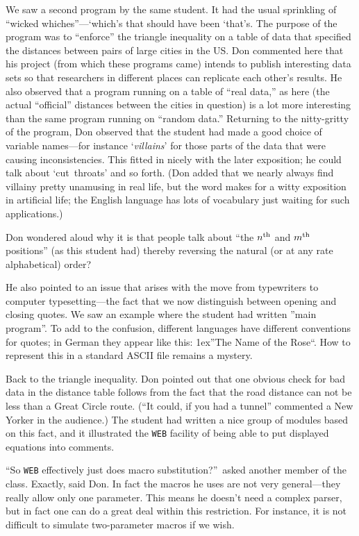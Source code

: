 We saw a second program by the same student. It had the usual
sprinkling of ``wicked whiches''---`which's that should have been
`that's. The purpose of the program was to ``enforce'' the triangle
inequality on a table of data that specified the distances between
pairs of large cities in the US\null. Don commented here that 
his project (from which these programs came) intends to publish
interesting data sets so that researchers in different places
can replicate each other's results.
He also observed that a program running on a table of ``real data,'' as
here (the actual ``official'' distances between the cities in question)
is a lot more interesting than the same program running on ``random
data.''  Returning to the
nitty-gritty of the program, Don observed that the student had made a
good choice of variable names---for instance `{\it villains}' for those
parts of the data that were causing inconsistencies. This fitted in
nicely with the later exposition; he could talk about `cut~throats' and
so forth. (Don added that we nearly always find villainy
pretty unamusing in real life, but the word makes for a witty exposition
in artificial life; the English language has lots of vocabulary just 
waiting for such applications.)

Don wondered aloud why it is that people talk about ``the $n^{\rm th}$ and 
$m^{\rm th}$
positions'' (as this student had) thereby reversing the natural (or at
any rate alphabetical) order?

He also pointed to an issue that arises with the move from typewriters
to computer typesetting---the fact that we now distinguish between
opening and closing quotes. We saw an example where the student had written
''main program''. To add to the confusion, different languages have
different conventions for quotes; in German they appear like this:
\lower1ex\hbox{''}The Name of the Rose``.
How to represent this in a standard ASCII file remains a mystery.

Back to the triangle inequality. Don pointed out that one obvious
check for bad data in the distance table follows from the fact that
the road distance can not be less than a Great Circle route. (``It
could, if you had a tunnel'' commented a New Yorker in the audience.)
The student had written a nice group of
modules based on this fact, and it
illustrated the {\tt WEB} facility of being able to put displayed equations
into comments.

``So {\tt WEB} effectively just does macro substitution?''\ asked another
member of the class. Exactly, said Don. 
In fact the macros
he uses are not very general---they really allow only one parameter.
This means he doesn't need a complex parser, but in fact one can do a
great deal within this restriction. For instance, it is not difficult
to simulate two-parameter macros if we wish.

